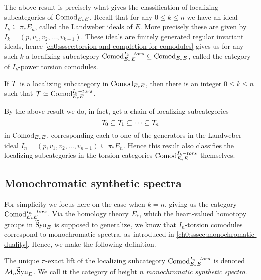 The above result is precisely what gives the classification of localizing subcategories of $\mathrm{Comod}_{E_*E}$. Recall that for any $0\leq k\leq n$ we have an ideal $I_k \subseteq \pi_* E_n$, called the Landweber ideals of $E$. More precisely these are given by $I_k = (p, v_1, v_2, \ldots, v_{k-1})$. These ideals are finitely generated regular invariant ideals, hence \cref{ch0:sssec:torsion-and-completion-for-comodules} gives us for any such $k$ a localizing subcategory $\mathrm{Comod}_{E_*E}^{I_k-tors}\subseteq \mathrm{Comod}_{E_*E}$, called the category of $I_k$-power torsion comodules. 

\begin{theorem}
    \label{ch3:add:thm:classification-of-abelian-localizing}
    If $\mathcal{T}$ is a localizing subcategory in $\mathrm{Comod}_{E_*E}$, then there is an integer $0\leq k\leq n$ such that $\mathcal{T} \simeq \mathrm{Comod}_{E_*E}^{I_k-tors}$. 
\end{theorem}

\begin{remark}
    By the above result we do, in fact, get a chain of localizing subcategories
    \[\mathcal{T}_0 \subseteq \mathcal{T}_1\subseteq \cdots \subseteq \mathcal{T}_n \]
    in $\mathrm{Comod}_{E_*E}$, corresponding each to one of the generators in the Landweber ideal $I_n=(p, v_1, v_2, \ldots, v_{n-1})\subseteq \pi_* E_n$. Hence this result also classifies the localizing subcategories in the torsion categories $\mathrm{Comod}_{E_*E}^{I_k-tors}$ themselves.  
\end{remark}


\subsection{Monochromatic synthetic spectra}

For simplicity we focus here on the case when $k=n$, giving us the category $\mathrm{Comod}_{E_*E}^{I_n-tors}$. Via the homology theory $E_*$, which the heart-valued homotopy groups in $\widetilde{\mathrm{S}}\mathrm{yn}_{E}$ is supposed to generalize, we know that $I_n$-torsion comodules correspond to monochromatic spectra, as introduced in \cref{ch0:sssec:monochromatic-duality}. Hence, we make the following definition. 

\begin{definition}
    The unique $\pi$-exact lift of the localizing subcategory $\mathrm{Comod}_{E_*E}^{I_n-tors}$ is denoted $\mathcal{M}_{n}\widetilde{\mathrm{S}}\mathrm{yn}_{E}$. We call it the category of height $n$ \emph{monochromatic synthetic spectra}. 
\end{definition}

